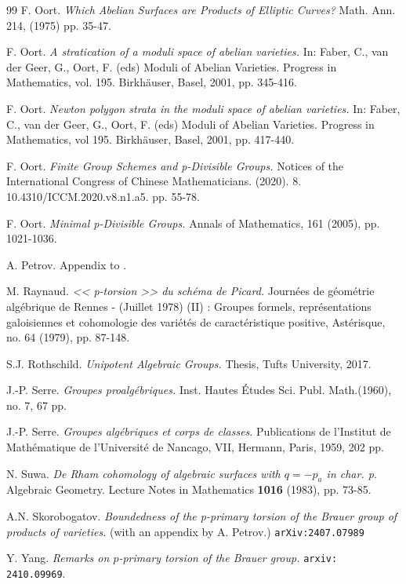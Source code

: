\documentclass[a4paper,12pt,twoside]{report}
\begin{document}
\begin{thebibliography}{99}
     F. Oort. \emph{Which Abelian Surfaces are Products of Elliptic Curves?} Math. Ann. 214, (1975) pp. 35-47.

     F. Oort. \emph{A stratication of a moduli space of abelian varieties.} In: Faber, C., van der Geer, G., Oort, F. (eds) Moduli of Abelian Varieties. Progress in Mathematics, vol. 195. Birkhäuser, Basel, 2001, pp. 345-416. 

     F. Oort. \emph{Newton polygon strata in the moduli space of abelian varieties.} In: Faber, C., van der Geer, G., Oort, F. (eds) Moduli of Abelian Varieties. Progress in Mathematics, vol 195. Birkhäuser, Basel, 2001, pp. 417-440. 

     F. Oort. \emph{Finite Group Schemes and p-Divisible Groups.} Notices of the International Congress of Chinese Mathematicians. (2020). 8. 10.4310/ICCM.2020.v8.n1.a5. pp. 55-78. 

     F. Oort. \emph{Minimal p-Divisible Groups. } Annals of Mathematics, 161 (2005), pp. 1021-1036.

     A. Petrov. Appendix to \cite{Sk}.

     M. Raynaud. \emph{<< p-torsion >> du schéma de Picard.} Journées de géométrie algébrique de Rennes - (Juillet 1978) (II) : Groupes formels, représentations galoisiennes et cohomologie des variétés de caractéristique positive, Astérisque, no. 64 (1979), pp. 87-148.

     S.J. Rothschild. \emph{Unipotent Algebraic Groups.} Thesis, Tufts University, 2017.

     J.-P. Serre. \emph{Groupes proalgébriques.} Inst. Hautes Études Sci. Publ. Math.(1960), no. 7, 67 pp.

     J.-P. Serre. \emph{Groupes algébriques et corps de classes}. Publications de l'Institut de Mathématique de l'Université de Nancago, VII, Hermann, Paris, 1959, 202 pp.
    
     N. Suwa. \emph{De Rham cohomology of algebraic surfaces with $q =-p_a$ in char. p}.  Algebraic Geometry. Lecture Notes in Mathematics {\bf 1016} (1983), pp. 73-85.

     A.N. Skorobogatov. \emph{Boundedness of the p-primary torsion of the Brauer group of products of varieties.} (with an appendix by A. Petrov.) \texttt{arXiv:2407.07989}
   

     Y. Yang. \emph{Remarks on $p$-primary torsion of the Brauer group.} \texttt{arxiv: 2410.09969}. 

  
\end{thebibliography}
\end{document}
